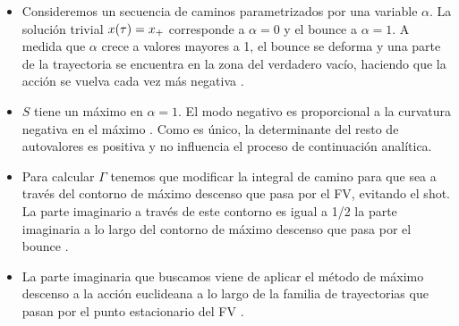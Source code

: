 \documentclass[11pt, a4paper]{article}
\numberwithin{equation}{section}
\theoremstyle{definition}
\begin{document}
\begin{itemize}

\item Consideremos un secuencia de caminos parametrizados por una variable $\alpha$. La solución trivial $x\qty(\tau) = x_+$ corresponde a $\alpha = 0$ y el bounce a $\alpha = 1$. A medida que $\alpha$ crece a valores mayores a 1, el bounce se deforma y una parte de la trayectoria se encuentra en la zona del verdadero vacío, haciendo que la acción se vuelva cada vez más negativa \cite{kleinert2009path}. 

\item $S$ tiene un máximo en $\alpha = 1$. El modo negativo es proporcional a la curvatura negativa en el máximo \cite{kleinert2009path}. Como es único, la determinante del resto de autovalores es positiva y no influencia el proceso de continuación analítica. 

\item Para calcular $\Gamma$ tenemos que modificar la integral de camino para que sea a través del contorno de máximo descenso que pasa por el FV, evitando el shot. La parte imaginario a través de este contorno es igual a 1/2 la parte imaginaria a lo largo del contorno de máximo descenso que pasa por el bounce \cite{andreassen2017precision}.

\item La parte imaginaria que buscamos viene de aplicar el método de máximo descenso a la acción euclideana a lo largo de la familia de trayectorias que pasan por el punto estacionario del FV \cite{andreassen2017precision}.  





\end{itemize}
\end{document}
